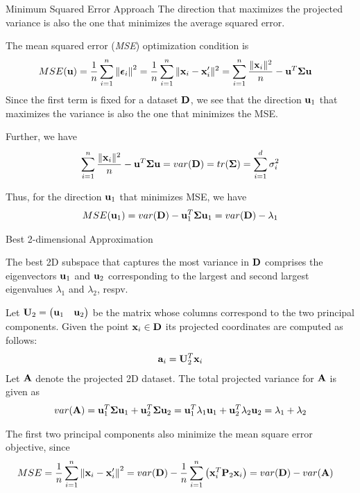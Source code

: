 \begin{frame}{Minimum Squared Error Approach}
The direction that
maximizes the projected variance is also the
one that minimizes the average squared error.


\medskip
The mean squared error ({\it MSE}) optimization condition is 
\begin{align*}
    MSE(\mathbf{u}) & =  {1 \over n} \sum_{i=1}^n \left\lVert{\bm \epsilon}_i\right\rVert^2
     =  {1 \over n} \sum_{i=1}^n \| \mathbf{x}_i - \mathbf{x}'_i \|^2 
	 =\sum_{i=1}^n \frac{\| \mathbf{x}_i\|^2}{n}-\mathbf{u}^T {\bm \Sigma} \mathbf{u}
\end{align*}
Since the first term is fixed for a dataset $\mathbf{D}$, we see that the
direction $\mathbf{u}_1$ that maximizes the
variance is also the one that minimizes the MSE.

\medskip
Further, we have
\begin{align*}
    \sum_{i=1}^n \frac{\| \mathbf{x}_i\|^2}{n}-\mathbf{u}^T {\bm \Sigma} \mathbf{u} = var(\mathbf{D}) = 
	tr({\bm \Sigma}) = \sum_{i=1}^d \sigma_i^2
\end{align*}

\medskip
Thus, for the direction $\mathbf{u}_1$ that minimizes MSE, we have
\begin{align*}
    MSE(\mathbf{u}_1) = var(\mathbf{D}) - \mathbf{u}_1^T{\bm \Sigma} \mathbf{u}_1 = var(\mathbf{D}) - \lambda_1 
\end{align*}
\end{frame}


\begin{frame}{Best 2-dimensional Approximation}

The best 2D subspace that captures the most variance in $\mathbf{D}$ comprises
the eigenvectors $\mathbf{u}_1$ and $\mathbf{u}_2$ corresponding to the largest and
second largest eigenvalues $\lambda_1$ and $\lambda_2$, respv.

\medskip
Let $\mathbf{U}_2 = \begin{pmatrix} \mathbf{u}_1 & \mathbf{u}_2 \end{pmatrix}$ 
be the matrix whose columns correspond to the two principal components.
Given the point $\mathbf{x}_i \in \mathbf{D}$ its projected coordinates are computed as follows:
\begin{align*}
    \mathbf{a}_i = \mathbf{U}_2^T \mathbf{x}_i
\end{align*}
Let $\mathbf{A}$ denote the projected 2D dataset.
The total projected variance for $\mathbf{A}$ is given as
\begin{align*}
    var(\mathbf{A})  = \mathbf{u}_1^T{\bm \Sigma}\mathbf{u}_1  + \mathbf{u}_2^T{\bm \Sigma} \mathbf{u}_2 =
	\mathbf{u}_1^T\lambda_1\mathbf{u}_1 + \mathbf{u}_2^T\lambda_2\mathbf{u}_2 =
    \lambda_1 + \lambda_2
\end{align*}

The first two principal components also
minimize the mean square error objective, since
\begin{align*}
    MSE & =  {1 \over n} \sum_{i=1}^n
    \left\lVert\mathbf{x}_i-\mathbf{x}_i'\right\rVert^2
	= var(\mathbf{D}) - {1\over n} \sum_{i=1}^n \left(\mathbf{x}_i^T \mathbf{P}_2 \mathbf{x}_i\right)
	= var(\mathbf{D}) - var(\mathbf{A})
\end{align*}
\end{frame}


